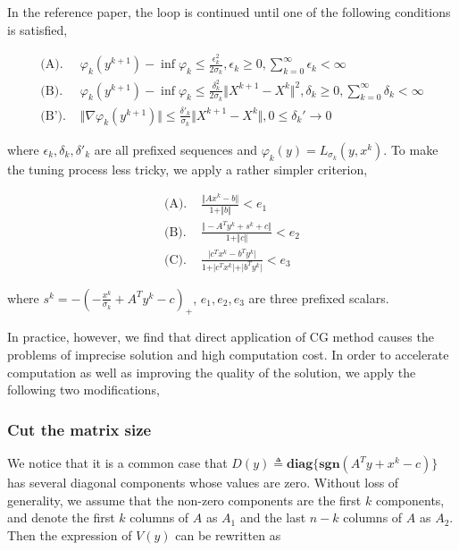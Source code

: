 \documentclass[a4paper]{article}
\begin{document}
In the reference paper, the loop is continued until one of the following conditions is satisfied, 

\begin{equation}
\begin{aligned}
\textrm{(A). }& \varphi_k(y^{k+1}) - \inf \varphi_k \leq \frac{\epsilon_k^2}{2\sigma_k}, \epsilon_k\geq 0, \sum_{k=0}^\infty\epsilon_k<\infty\\
\textrm{(B). }& \varphi_k(y^{k+1}) - \inf \varphi_k \leq \frac{\delta_k^2}{2\sigma_k}\Vert X^{k+1} - X^k\Vert^2, \delta_k\geq 0, \sum_{k=0}^\infty\delta_k<\infty\\
\textrm{(B'). }& \Vert\nabla\varphi_k(y^{k+1})\Vert \leq \frac{\delta'_k}{\sigma_k}\Vert X^{k+1} - X^k\Vert, 0\leq \delta_k'\rightarrow 0
\end{aligned}
\end{equation}

where $\epsilon_k, \delta_k, \delta'_k$ are all prefixed sequences and $\varphi_k(y) = L_{\sigma_k}(y, x^k)$. To make the tuning process less tricky, we apply a rather simpler criterion, 

\begin{equation}
\begin{aligned}
\textrm{(A). }& \frac{\Vert Ax^k - b\Vert}{1 + \Vert b\Vert} < e_1\\
\textrm{(B). }& \frac{\Vert -A^Ty^k + s^k + c\Vert}{1 + \Vert c\Vert} < e_2\\
\textrm{(C). }&  \frac{\vert c^T x^k -b^Ty^k\vert}{1 + \vert c^Tx^k\vert + \vert b^Ty^k\vert} < e_3
\end{aligned}
\end{equation}

where $s^k = -(-\frac{x^k}{\sigma_k} + A^Ty^k - c)_+$, $e_1, e_2, e_3$ are three prefixed scalars. 

In practice, however, we find that direct application of CG method causes the problems of imprecise solution and high computation cost. In order to accelerate computation as well as improving the quality of the solution, we apply the following two modifications, 

\subsubsection{Cut the matrix size}
We notice that it is a common case that $D(y) \triangleq \mathbf{diag}\{ \mathbf{sgn}(A^Ty + x^k -c) \} $ has several diagonal components whose values are zero. Without loss of generality, we assume that the non-zero components are the first $k$ components, and denote the first $k$ columns of $A$ as $A_1$ and the last $n - k$ columns of $A$ as $A_2$. Then the expression of $V(y)$ can be rewritten as
\end{document}
